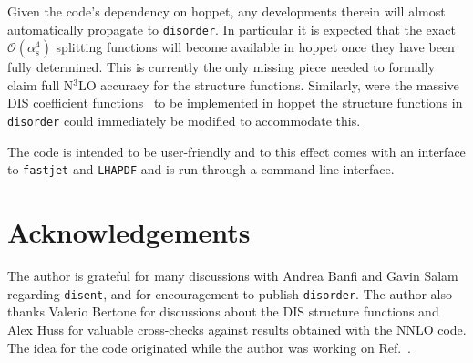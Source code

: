 \documentclass[submission, PhysCodeb]{SciPost}
\newcommand{\hoppet}{{\sc hoppet}}
\newcommand{\disent}{{\tt disent}}
\newcommand{\disorder}{{\tt disorder}}
\newcommand{\fastjet}{{\tt fastjet}}
\newcommand{\lhapdf}{{\tt LHAPDF}}
\newcommand{\nnlojet}{NNLO{\sc{jet}}}
\newcommand{\as}{\alpha_{\mathrm{s}}}
\newcommand{\NNNLO}{N$^3$LO}
\begin{document}
Given the code's dependency on \hoppet{}, any developments therein
will almost automatically propagate to \disorder{}. In particular it
is expected that the exact $\mathcal{O}(\as^4)$ splitting functions
will become available in \hoppet{} once they have been fully
determined. This is currently the only missing piece needed to
formally claim full \NNNLO{} accuracy for the structure
functions. Similarly, were the massive DIS coefficient
functions~\cite{Gottschalk:1980rv,Laenen:1992zk,Laenen:1992xs,Gluck:1997sj,Blumlein:2011zu,Behring:2015roa,Berger:2016inr,Gao:2017kkx}
to be implemented in \hoppet{} the structure functions in \disorder{}
could immediately be modified to accommodate this.

The code is intended to be user-friendly and to this effect comes with
an interface to \fastjet{} and \lhapdf{} and is run through a
command line interface. 

\section*{Acknowledgements}
The author is grateful for many discussions with Andrea Banfi and
Gavin Salam regarding \disent{}, and for encouragement to publish
\disorder{}. The author also thanks Valerio Bertone for discussions
about the DIS structure functions and Alex Huss for valuable cross-checks
against results obtained with the \nnlojet{} code. The idea for the
code originated while the author was working on
Ref.~\cite{Banfi:2023mhz}.


%
%



\nolinenumbers
\end{document}

